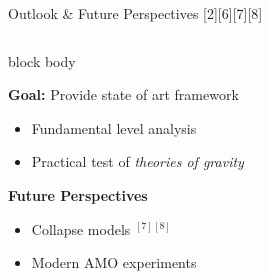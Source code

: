 \documentclass[aspectratio=169]{beamer}
\begin{document}
\begin{frame}{Outlook \& Future Perspectives [2][6][7][8]}
\vspace{0.3cm}

\begin{columns}[T, totalwidth=\textwidth]



\begin{column}{\textwidth}



\begin{beamercolorbox}[rounded=true, shadow=false, sep=6pt, wd=\linewidth]{block body}
\footnotesize

\textbf{Goal:} Provide state of art framework

\begin{itemize}
    \item Fundamental level analysis
    \item Practical test of \textit{theories of gravity}
\end{itemize}

\vspace{0.2cm}

\textbf{Future Perspectives}

\begin{itemize}
    \item Collapse models $^{[7][8]}$
    \item Modern AMO experiments
\end{itemize}




\end{beamercolorbox}

\end{column}

\end{columns}

\end{frame}
\end{document}
